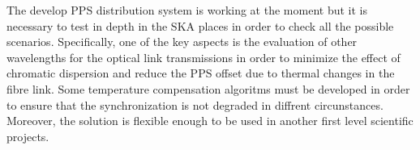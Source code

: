 The develop PPS distribution system is working at the moment but it is 
necessary to test in depth in the SKA places in order to check all the 
possible scenarios. Specifically, one of the key aspects is the evaluation of 
other wavelengths for the optical link transmissions in order to minimize the 
effect of chromatic dispersion and reduce the PPS offset due to thermal changes 
in the fibre link. Some temperature compensation algoritms must be developed in order to ensure that the synchronization is not degraded in diffrent circunstances.
Moreover, the solution is flexible enough to be used in 
another first level scientific projects. 
